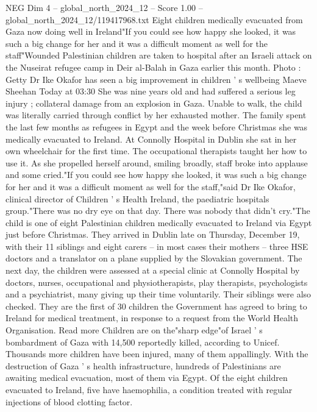 \begin{textsample}{NEG Dim 4 – global\_north\_2024\_12 – Score 1.00 – global\_north\_2024\_12/119417968.txt}  \label{ex:f4_neg_160}
Eight children medically evacuated from Gaza now doing well in Ireland"If you could see how happy she looked, it was such a big change for her and it was a difficult moment as well for the staff"Wounded Palestinian children are taken to hospital after an Israeli attack on the Nuseirat refugee camp in Deir al-Balah in Gaza earlier this month.
Photo : Getty Dr Ike Okafor has seen a big improvement in children ' s wellbeing Maeve Sheehan Today at 03:30 She was nine years old and had suffered a serious leg injury ; collateral damage from an explosion in Gaza.
Unable to walk, the child was literally carried through conflict by her exhausted mother.
The family spent the last few months as refugees in Egypt and the week before Christmas she was medically evacuated to Ireland.
At Connolly Hospital in Dublin she sat in her own wheelchair for the first time.
The occupational therapists taught her how to use it.
As she propelled herself around, smiling broadly, staff broke into applause and some cried."If you could see how happy she looked, it was such a big change for her and it was a difficult moment as well for the staff,"said Dr Ike Okafor, clinical director of Children ' s Health Ireland, the paediatric hospitals group."There was no dry eye on that day.
There was nobody that didn't cry."The child is one of eight Palestinian children medically evacuated to Ireland via Egypt just before Christmas.
They arrived in Dublin late on Thursday, December 19, with their 11 siblings and eight carers -- in most cases their mothers -- three HSE doctors and a translator on a plane supplied by the Slovakian government.
The next day, the children were assessed at a special clinic at Connolly Hospital by doctors, nurses, occupational and physiotherapists, play therapists, psychologists and a psychiatrist, many giving up their time voluntarily.
Their siblings were also checked.
They are the first of 30 children the Government has agreed to bring to Ireland for medical treatment, in response to a request from the World Health Organisation.
Read more Children are on the"sharp edge"of Israel ' s bombardment of Gaza with 14,500 reportedly killed, according to Unicef.
Thousands more children have been injured, many of them appallingly.
With the destruction of Gaza ' s health infrastructure, hundreds of Palestinians are awaiting medical evacuation, most of them via Egypt.
Of the eight children evacuated to Ireland, five have haemophilia, a condition treated with regular injections of blood clotting factor.

\end{textsample}
